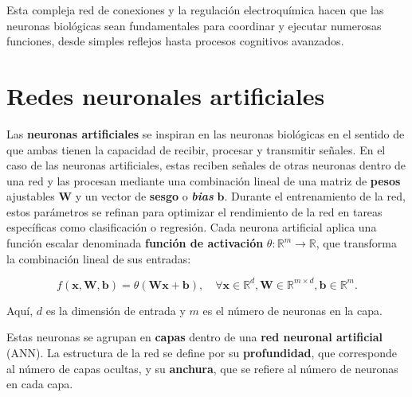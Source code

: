 Esta compleja red de conexiones y la regulación electroquímica hacen que las
neuronas biológicas sean fundamentales para coordinar y ejecutar numerosas
funciones, desde simples reflejos hasta procesos cognitivos avanzados.

\section{Redes neuronales artificiales}

Las \textbf{neuronas artificiales} se inspiran en las neuronas biológicas en el sentido
de que ambas tienen la capacidad de recibir, procesar y transmitir señales. En el
caso de las neuronas artificiales, estas reciben señales de otras neuronas
dentro de una red y las procesan mediante una combinación lineal de una matriz
de \textbf{pesos} ajustables $\mathbf{W}$ y un vector de \textbf{sesgo} o
\textbf{\textit{bias}} $\mathbf{b}$. Durante el entrenamiento de la red, estos parámetros
se refinan para optimizar el rendimiento de la red en tareas específicas como clasificación
o regresión. Cada neurona artificial aplica una función escalar denominada
\textbf{función de activación} $\theta: \mathbb{R}^{m} \to \mathbb{R}$, que
transforma la combinación lineal de sus entradas:

\[
f(\mathbf{x}, \mathbf{W}, \mathbf{b}) = \theta(\mathbf{W}\mathbf{x}+ \mathbf{b}
), \quad \forall \mathbf{x}\in \mathbb{R}^{d}, \mathbf{W}\in \mathbb{R}^{m
	\times d}, \mathbf{b}\in \mathbb{R}^{m}.
\]

Aquí, $d$ es la dimensión de entrada y $m$ es el número de neuronas en la capa.

Estas neuronas se agrupan en \textbf{capas} dentro de una \textbf{red neuronal
	artificial} (ANN). La estructura de la red se define por su \textbf{profundidad},
que corresponde al número de capas ocultas, y su \textbf{anchura}, que se
refiere al número de neuronas en cada capa.

